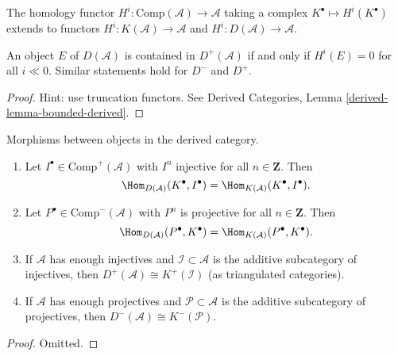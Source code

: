 \noindent
The homology functor $H^i : \text{Comp}(\mathcal{A}) \to \mathcal{A}$ taking a
complex $K^\bullet \mapsto H^i(K^\bullet)$ extends to functors $H^i :
K(\mathcal{A}) \to \mathcal{A}$ and $H^i : D(\mathcal{A}) \to \mathcal{A}$.

\begin{lemma}
\label{lemma-when-in-bounded}
An object $E$ of $D(\mathcal{A})$ is contained in $D^+(\mathcal{A})$ if and
only if $H^i(E) =0 $ for all $i \ll 0$. Similar statements hold for $D^-$ and
$D^+$.
\end{lemma}

\begin{proof}
Hint: use truncation functors. See
Derived Categories, Lemma \ref{derived-lemma-bounded-derived}.
\end{proof}

\begin{lemma}
\label{lemma-derived-categories}
Morphisms between objects in the derived category.
\begin{enumerate}
\item
Let $I^\bullet \in \text{Comp}^+(\mathcal{A})$ with $I^n$ injective for all
$n \in \mathbf{Z}$. Then
$$
\Hom_{D(\mathcal{A})}(K^\bullet, I^\bullet)
=
\Hom_{K(\mathcal{A})}(K^\bullet, I^\bullet).
$$
\item
Let $P^\bullet \in \text{Comp}^-(\mathcal{A})$ with $P^n$ is projective for all
$n \in \mathbf{Z}$. Then
$$
\Hom_{D(\mathcal{A})}(P^\bullet, K^\bullet)
=
\Hom_{K(\mathcal{A})}(P^\bullet, K^\bullet).
$$
\item
If $\mathcal{A}$ has enough injectives and $\mathcal{I} \subset \mathcal{A}$
is the additive subcategory of injectives, then
$
D^+(\mathcal{A})\cong K^+(\mathcal{I})
$
(as triangulated categories).
\item
If $\mathcal{A}$ has enough projectives and $\mathcal{P} \subset \mathcal{A}$
is the additive subcategory of projectives, then
$
D^-(\mathcal{A}) \cong K^-(\mathcal{P}).
$
\end{enumerate}
\end{lemma}

\begin{proof}
Omitted.
\end{proof}

